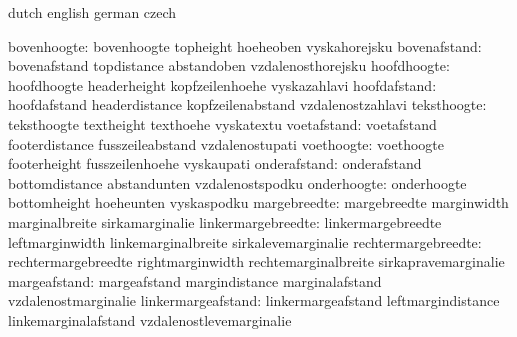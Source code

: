 


\startcommands                  dutch                        english
                                german                       czech


                  bovenhoogte:  bovenhoogte                  topheight
                                hoeheoben                    vyskahorejsku
                 bovenafstand:  bovenafstand                 topdistance
                                abstandoben                  vzdalenosthorejsku
                  hoofdhoogte:  hoofdhoogte                  headerheight
                                kopfzeilenhoehe              vyskazahlavi
                 hoofdafstand:  hoofdafstand                 headerdistance
                                kopfzeilenabstand            vzdalenostzahlavi
                  teksthoogte:  teksthoogte                  textheight
                                texthoehe                    vyskatextu
                  voetafstand:  voetafstand                  footerdistance
                                fusszeileabstand             vzdalenostupati
                   voethoogte:  voethoogte                   footerheight
                                fusszeilenhoehe              vyskaupati
                 onderafstand:  onderafstand                 bottomdistance
                                abstandunten                 vzdalenostspodku
                  onderhoogte:  onderhoogte                  bottomheight
                                hoeheunten                   vyskaspodku
                 margebreedte:  margebreedte                 marginwidth
                                marginalbreite               sirkamarginalie
           linkermargebreedte:  linkermargebreedte           leftmarginwidth
                                linkemarginalbreite          sirkalevemarginalie
          rechtermargebreedte:  rechtermargebreedte          rightmarginwidth
                                rechtemarginalbreite         sirkapravemarginalie
                 margeafstand:  margeafstand                 margindistance
                                marginalafstand              vzdalenostmarginalie
           linkermargeafstand:  linkermargeafstand           leftmargindistance
                                linkemarginalafstand         vzdalenostlevemarginalie
